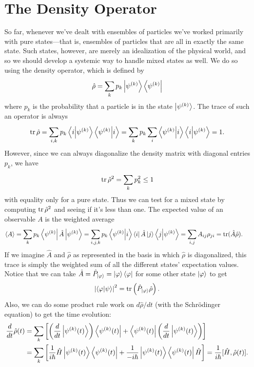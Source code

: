 \documentclass[../p116main.tex]{subfiles}
\begin{document}
\section{The Density Operator}
So far, whenever we've dealt with ensembles of particles we've worked primarily with pure states---that is, ensembles of particles that are all in exactly the same state.
Such states, however, are merely an idealization of the physical world, and so we should develop a systemic way to handle mixed states as well.
We do so using the density operator, which is defined by
\[ \hat \rho = \sum_{k}^{} p_k \left| \psi^{(k)} \right> \left< \psi^{(k)} \right| \]
where $p_k$ is the probability that a particle is in the state $\left| \psi^{(k)} \right>$.
The trace of such an operator is always
\[ \operatorname{tr} \hat \rho = \sum_{i,k}^{} p_k \left< i \middle| \psi^{(k)} \right> \left< \psi^{(k)} \middle| i \right> = \sum_{k}^{} p_k \sum_{i}^{} \left< \psi^{(k)} \middle| i \right> \left< i \middle| \psi^{(k)} \right> = 1. \]
However, since we can always diagonalize the density matrix with diagonal entries $p_k$, we have
\[ \operatorname{tr} \hat \rho^2 = \sum_{k}^{} p_k^2 \leq 1 \]
with equality only for a pure state.
Thus we can test for a mixed state by computing $\operatorname{tr} \hat \rho^2$ and seeing if it's less than one.
The expected value of an observable $A$ is the weighted average
\begin{align*}
    \langle A \rangle &= \sum_{k}^{} p_k \left< \psi^{(k)} \right| \hat A \left| \psi^{(k)} \right> = \sum_{i,j,k}^{} p_k \left< \psi^{(k)} \middle| i \right> \left< i \right| \hat A \left| j \right> \left< j \middle| \psi^{(k)} \right> = \sum_{i,j}^{} A_{ij} \rho_{ji} = \operatorname{tr} (\hat A \hat \rho).
\end{align*}
If we imagine $\hat A$ and $\hat \rho$ as represented in the basis in which $\hat \rho$ is diagonalized, this trace is simply the weighted sum of all the different states' expectation values.
Notice that we can take $\hat A = \hat P_{\left| \varphi \right>} = \left| \varphi \right> \left< \varphi \right|$ for some other state $\left| \varphi \right>$ to get
\[ \left| \left< \varphi \middle| \psi \right> \right|^2 = \operatorname{tr} \left( \hat P_{\left| \varphi \right>} \hat \rho \right). \]
Also, we can do some product rule work on $d \hat \rho / dt$ (with the Schrödinger equation) to get the time evolution:
\begin{align*}
    \frac{d}{dt} \hat \rho(t) &= \sum_{k}^{} \left[ \left( \frac{d}{dt} \left| \psi^{(k)}(t) \right> \right) \left< \psi^{(k)}(t) \right| + \left< \psi^{(k)}(t) \right| \left( \frac{d}{dt} \left| \psi^{(k)}(t) \right> \right) \right] \\
    &= \sum_{k}^{} \left[ \frac{1}{i\hbar} \hat H \left| \psi^{(k)}(t) \right> \left< \psi^{(k)}(t) \right| + \frac{1}{-i\hbar} \left| \psi^{(k)}(t) \right> \left< \psi^{(k)}(t) \right| \hat H \right] = \frac{1}{i\hbar} [\hat H, \hat \rho(t)].
\end{align*}
\end{document}
